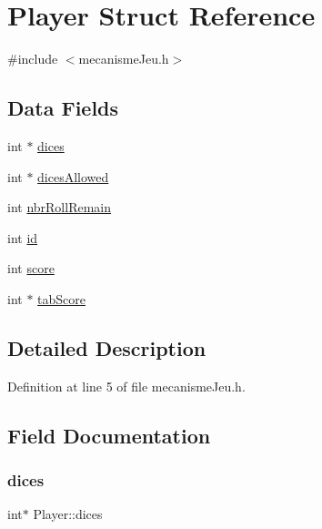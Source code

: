 \hypertarget{structPlayer}{}\section{Player Struct Reference}
\label{structPlayer}


{\ttfamily \#include $<$mecanisme\+Jeu.\+h$>$}

\subsection*{Data Fields}
\begin{DoxyCompactItemize}
\item 
int $\ast$ \hyperlink{structPlayer_a676bd9687aaa50806f419c4ae170bcb2}{dices}
\item 
int $\ast$ \hyperlink{structPlayer_adb33524b9364f3e0bcfc5bd098cdaaf0}{dices\+Allowed}
\item 
int \hyperlink{structPlayer_ae4c871b61a2af583a8b5975d736bea5d}{nbr\+Roll\+Remain}
\item 
int \hyperlink{structPlayer_a05e05f3a23de78da7ec032ec2bcf8c6c}{id}
\item 
int \hyperlink{structPlayer_ace6abae8d66534ad0a1fd6458f786a6e}{score}
\item 
int $\ast$ \hyperlink{structPlayer_a7d5c0f37c78c868e4721cc8ceece92a6}{tab\+Score}
\end{DoxyCompactItemize}


\subsection{Detailed Description}


Definition at line 5 of file mecanisme\+Jeu.\+h.



\subsection{Field Documentation}
\mbox{\label{structPlayer_a676bd9687aaa50806f419c4ae170bcb2}} 
\subsubsection{\texorpdfstring{dices}{dices}}
{\footnotesize\ttfamily int$\ast$ Player\+::dices}



